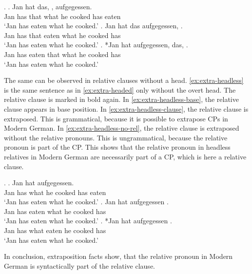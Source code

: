 \ex.\label{ex:extra-headed}
\ag. Jan hat das,    , aufgegessen.\\
 Jan has that what he cooked has eaten\\
`Jan has eaten what he cooked.'\label{ex:extra-headed-base}
\bg. Jan hat das aufgegessen,    .\\
 Jan has that eaten what he cooked has\\
`Jan has eaten what he cooked.'\label{ex:extra-headed-only-clause}
\cg. *Jan hat aufgegessen, das,    .\\
 Jan has eaten that what he cooked has\\
`Jan has eaten what he cooked.'\label{ex:extra-headed-head-clause}

The same can be observed in relative clauses without a head. \ref{ex:extra-headless} is the same sentence as in \ref{ex:extra-headed} only without the overt head. The relative clause is marked in bold again.
In \ref{ex:extra-headless-base}, the relative clause appears in base position. In \ref{ex:extra-headless-clause}, the relative clause is extraposed. This is grammatical, because it is possible to extrapose CPs in Modern German. In \ref{ex:extra-headless-no-rel}, the relative clause is extraposed without the relative pronouns. This is ungrammatical, because the relative pronoun is part of the CP.
This shows that the relative pronoun in headless relatives in Modern German are necessarily part of a CP, which is here a relative clause.

\ex.\label{ex:extra-headless}
\ag. Jan hat     aufgegessen.\\
Jan has what he cooked has eaten\\
`Jan has eaten what he cooked.'\label{ex:extra-headless-base}
\bg. Jan hat aufgegessen    .\\
Jan has eaten what he cooked has\\
`Jan has eaten what he cooked.'\label{ex:extra-headless-clause}
\bg. *Jan hat  aufgegessen   .\\
Jan has what eaten he cooked has\\
`Jan has eaten what he cooked.'\label{ex:extra-headless-no-rel}

In conclusion, extraposition facts show, that the relative pronoun in Modern German is syntactically part of the relative clause.


